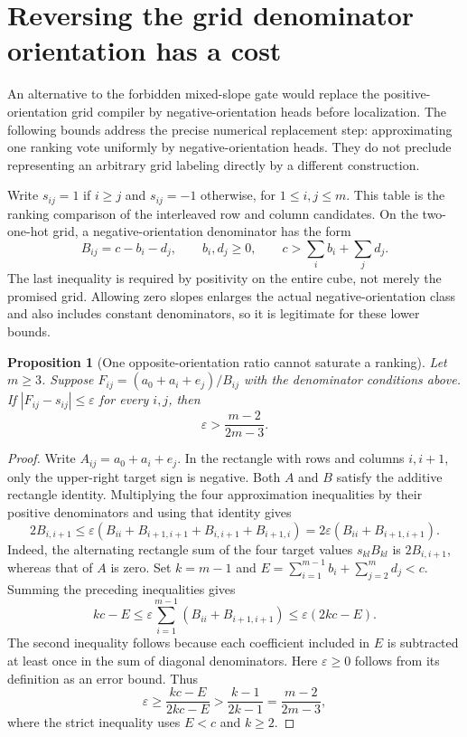 \documentclass[11pt]{article}
\newtheorem{proposition}{Proposition}
\begin{document}
\section{Reversing the grid denominator orientation has a cost}

An alternative to the forbidden mixed-slope gate would replace the
positive-orientation grid compiler by negative-orientation heads
before localization. The following bounds address the precise
numerical replacement step: approximating one ranking vote uniformly
by negative-orientation heads. They do not preclude representing an
arbitrary grid labeling directly by a different construction.

Write $s_{ij}=1$ if $i\geq j$ and $s_{ij}=-1$ otherwise, for
$1\leq i,j\leq m$. This table is the ranking comparison of the
interleaved row and column candidates. On the two-one-hot grid, a
negative-orientation denominator has the form
\[
 B_{ij}=c-b_i-d_j,\qquad b_i,d_j\geq0,\qquad
 c>\sum_i b_i+\sum_jd_j.
\]
The last inequality is required by positivity on the entire cube,
not merely the promised grid. Allowing zero slopes enlarges the
actual negative-orientation class and also includes constant
denominators, so it is legitimate for these lower bounds.

\begin{proposition}[One opposite-orientation ratio cannot saturate a ranking]
Let $m\geq3$. Suppose $F_{ij}=(a_0+a_i+e_j)/B_{ij}$ with the
denominator conditions above. If
$|F_{ij}-s_{ij}|\leq\varepsilon$ for every $i,j$, then
\[
 \varepsilon>\frac{m-2}{2m-3}.
\]
\end{proposition}
\begin{proof}
Write $A_{ij}=a_0+a_i+e_j$. In the rectangle with rows and columns
$i,i+1$, only the upper-right target sign is negative. Both $A$ and
$B$ satisfy the additive rectangle identity. Multiplying the four
approximation inequalities by their positive denominators and
using that identity gives
\[
 2B_{i,i+1}
 \leq\varepsilon(B_{ii}+B_{i+1,i+1}+B_{i,i+1}+B_{i+1,i})
 =2\varepsilon(B_{ii}+B_{i+1,i+1}).
\]
Indeed, the alternating rectangle sum of the four target values
$s_{kl}B_{kl}$ is $2B_{i,i+1}$, whereas that of $A$ is zero.
Set $k=m-1$ and
$E=\sum_{i=1}^{m-1}b_i+\sum_{j=2}^m d_j<c$.
Summing the preceding inequalities gives
\[
 kc-E\leq\varepsilon
   \sum_{i=1}^{m-1}(B_{ii}+B_{i+1,i+1})
 \leq\varepsilon(2kc-E).
\]
The second inequality follows because each coefficient included in
$E$ is subtracted at least once in the sum of diagonal denominators.
Here $\varepsilon\geq0$ follows from its definition as an error
bound. Thus
\[
 \varepsilon\geq\frac{kc-E}{2kc-E}
 >\frac{k-1}{2k-1}=\frac{m-2}{2m-3},
\]
where the strict inequality uses $E<c$ and $k\geq2$.
\end{proof}
\end{document}
